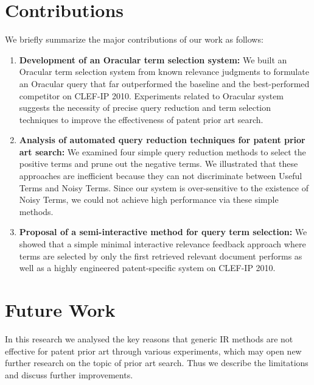 \section{Contributions}
\label{sec:contributions}
We briefly summarize the major contributions of our work as follows:
\begin{enumerate}
\item \textbf{Development of an Oracular term selection system: }We built an Oracular term selection system from known relevance judgments to formulate an Oracular query that far outperformed the baseline and the best-performed competitor on CLEF-IP 2010. 
Experiments related to Oracular system suggests the necessity of precise query
reduction and term selection techniques to improve the effectiveness of patent
prior art search.
\item \textbf{Analysis of automated query reduction techniques for patent prior art search: } We examined four simple query reduction methods to select the positive terms and prune out the negative terms. We illustrated that these approaches are inefficient because they can not discriminate between Useful Terms and Noisy Terms. Since our system is over-sensitive to the existence of Noisy Terms, we could not achieve high performance via these simple methods. 
\item \textbf{Proposal of a semi-interactive method for query term selection: }We showed that a simple minimal interactive relevance feedback approach where terms are selected by only the first retrieved relevant document performs as well as a highly engineered patent-specific system on CLEF-IP 2010. 
\end{enumerate}

\section{Future Work}
\label{sec:future}
In this research we analysed the key reasons that generic IR methods are not effective for patent prior art through various experiments, which may open new further research on the topic of prior art search. Thus we describe the limitations and discuss further improvements.

